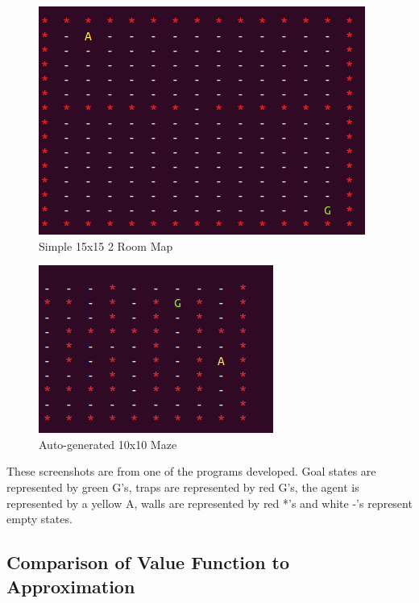 \documentclass[12pt, letterpaper, final]{report}
\begin{document}
\FloatBarrier
\begin{figure}[h!]
\centering
\includegraphics[scale=.5]{images/15x152room.png}
\caption{Simple 15x15 2 Room Map}
\label{15x152roomMap}
\end{figure}
\FloatBarrier

\FloatBarrier
\begin{figure}[h!]
\centering
\includegraphics[scale=.5]{images/maze01_world.png}
\caption{Auto-generated 10x10 Maze}
\label{10x102roomMap}
\end{figure}
\FloatBarrier

These screenshots are from one of the programs developed. Goal states
are represented by green G's, traps are represented by red G's, the
agent is represented by a yellow A, walls are represented by red *'s and
white -'s represent empty states.

\subsection*{Comparison of Value Function to Approximation}
\end{document}
